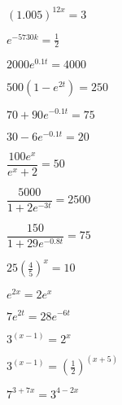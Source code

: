 \documentclass{ximera}
\begin{document}
\begin{question}
\begin{problem}
$(1.005)^{12x} = 3$   
\end{problem}

\begin{problem}
$e^{-5730k} = \frac{1}{2}$  
\end{problem}

\begin{problem}
$2000e^{0.1t} = 4000$    
\end{problem}

\begin{problem}
$500\left(1-e^{2t}\right) = 250$    
\end{problem} 

\begin{problem}
$70 + 90e^{-0.1t} = 75$   
\end{problem} 

\begin{problem}
$30-6e^{-0.1t}=20$   
\end{problem}  

\begin{problem}
$\dfrac{100e^{x}}{e^{x}+2}=50$ 
\end{problem} 

\begin{problem}
$\dfrac{5000}{1+2e^{-3t}}=2500$ 
\end{problem} 

\begin{problem}
$\dfrac{150}{1 + 29e^{-0.8t}} = 75$
\end{problem}   

\begin{problem}
$25\left(\frac{4}{5}\right)^{x} = 10$
\end{problem}      

\begin{problem}
$e^{2x} = 2e^{x}$ 
\end{problem}  

\begin{problem}
$7e^{2t} = 28e^{-6t}$
\end{problem}
 
\begin{problem}
$3^{(x - 1)} = 2^{x}$
\end{problem}

\begin{problem}
$3^{(x - 1)} = \left(\frac{1}{2}\right)^{(x + 5)}$
\end{problem}

\begin{problem}
$7^{3+7x} = 3^{4-2x}$  
\end{problem}  


\end{question}
\end{document}
